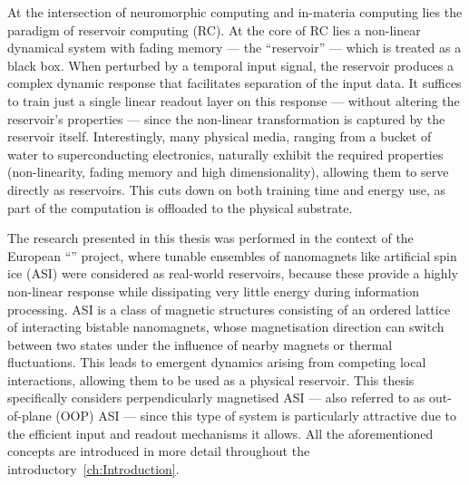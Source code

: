 At the intersection of neuromorphic computing and in-materia computing lies the paradigm of reservoir computing (RC).
At the core of RC lies a non-linear dynamical system with fading memory --- the ``reservoir'' --- which is treated as a black box.
When perturbed by a temporal input signal, the reservoir produces a complex dynamic response that facilitates separation of the input data.
It suffices to train just a single linear readout layer on this response --- without altering the reservoir's properties --- since the non-linear transformation is captured by the reservoir itself.
Interestingly, many physical media, ranging from a bucket of water to superconducting electronics, naturally exhibit the required properties (non-linearity, fading memory and high dimensionality), allowing them to serve directly as reservoirs. %
This cuts down on both training time and energy use, as part of the computation is offloaded to the physical substrate. \par
The research presented in this thesis was performed in the context of the European ``\spinengine'' project, where tunable ensembles of nanomagnets like artificial spin ice (ASI) were considered as real-world reservoirs, because these provide a highly non-linear response while dissipating very little energy during information processing.
ASI is a class of magnetic structures consisting of an ordered lattice of interacting bistable nanomagnets, whose magnetisation direction can switch between two states under the influence of nearby magnets or thermal fluctuations.
This leads to emergent dynamics arising from competing local interactions, allowing them to be used as a physical reservoir.
This thesis specifically considers perpendicularly magnetised ASI --- also referred to as out-of-plane (OOP) ASI --- since this type of system is particularly attractive due to the efficient input and readout mechanisms it allows.
All the aforementioned concepts are introduced in more detail throughout the introductory~\cref{ch:Introduction}. \\

